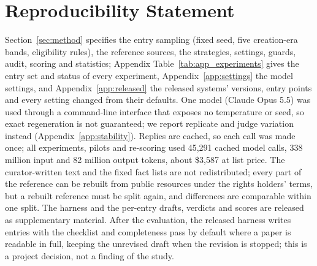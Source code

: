 \documentclass{article} %
\begin{document}
\section*{Reproducibility Statement}
Section~\ref{sec:method} specifies the entry sampling (fixed seed, five creation-era bands, eligibility rules), the reference sources, the strategies, settings, guards, audit, scoring and statistics; Appendix Table~\ref{tab:app_experiments} gives the entry set and status of every experiment, Appendix~\ref{app:settings} the model settings, and Appendix~\ref{app:released} the released systems' versions, entry points and every setting changed from their defaults. One model (Claude Opus 5.5) was used through a command-line interface that exposes no temperature or seed, so exact regeneration is not guaranteed; we report replicate and judge variation instead (Appendix~\ref{app:stability}). Replies are cached, so each call was made once; all experiments, pilots and re-scoring used 45,291 cached model calls, 338 million input and 82 million output tokens, about \$3,587 at list price. The curator-written text and the fixed fact lists are not redistributed; every part of the reference can be rebuilt from public resources under the rights holders' terms, but a rebuilt reference must be split again, and differences are comparable within one split. The harness and the per-entry drafts, verdicts and scores are released as supplementary material. After the evaluation, the released harness writes entries with the checklist and completeness pass by default where a paper is readable in full, keeping the unrevised draft when the revision is stopped; this is a project decision, not a finding of the study.




\clearpage
\appendix
\setlength{\belowcaptionskip}{4pt}
\makeatletter
\setlength{\@fptop}{0pt}
\setlength{\@fpbot}{0pt plus 1fil}
\setlength{\@fpsep}{8pt plus 2pt minus 2pt}
\setlength{\abovecaptionskip}{4pt}
\setlength{\intextsep}{8pt plus 2pt minus 2pt}
\setlength{\floatsep}{8pt plus 2pt minus 2pt}
\setlength{\textfloatsep}{12pt plus 2pt minus 2pt}
\makeatother
\FloatBarrier
\end{document}
